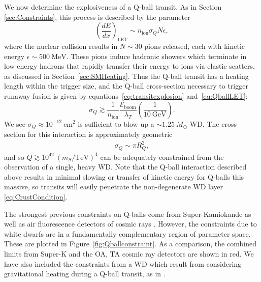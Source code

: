 \documentclass[twocolumn, preprintnumbers,amsmath,amssymb,prd, superscriptaddress]{revtex4}
\newcommand{\Eboom}{\mathcal{E}_\text{boom}}
\newcommand{\GeV}{\text{GeV}}
\def\r{\right)}
\def\l{\left(}
\begin{document}
We now determine the explosiveness of a Q-ball transit.
As in Section \ref{sec:Constraints}, this process is described by the parameter
\begin{equation}
\label{eq:QballLET}
\l\frac{dE}{dx}\r_\text{LET} \sim n_\text{ion} \sigma_Q N \epsilon,
\end{equation}
where the nuclear collision results in $N \sim 30$ pions released, each with kinetic energy $\epsilon \sim 500 ~\text{MeV}$.
These pions induce hadronic showers which terminate in low-energy hadrons that rapidly transfer their energy to ions via elastic scatters, as discussed in Section~\ref{sec:SMHeating}.
Thus the Q-ball transit has a heating length within the trigger size, and the Q-ball cross-section necessary to trigger runaway fusion is given by equations~\eqref{eq:transitexplosion} and~\eqref{eq:QballLET}:
\begin{equation}
 \sigma_Q \gtrsim \frac{1}{n_\text{ion}} \frac{\Eboom}{\lambda_T}
 \l \frac{1}{10~\GeV} \r.
\end{equation}
We see $\sigma_Q \approx 10^{-12} ~\text{cm}^2$ is sufficient to blow up a $\sim 1.25 ~M_{\odot}$ WD.
The cross-section for this interaction is approximately geometric
\begin{align}
\sigma_Q \sim \pi R_Q^2,
\end{align}
and so $Q \gtrsim 10^{42} ~(m_S/\text{TeV})^4$ can be adequately constrained from the observation of a single, heavy WD.
Note that the Q-ball interaction described above results in minimal slowing or transfer of kinetic energy for Q-balls this massive, so transits will easily penetrate the non-degenerate WD layer \eqref{eq:CrustCondition}.

The strongest previous constraints on Q-balls come from Super-Kamiokande as well as air fluorescence detectors of cosmic rays \cite{Dine:2003ax}.
However, the constraints due to white dwarfs are in a fundamentally complementary region of parameter space.
These are plotted in Figure~\ref{fig:Qballconstraint}.
As a comparison, the combined limits from Super-K and the OA, TA cosmic ray detectors are shown in red.
We have also included the constraints from a WD which result from considering gravitational heating during a Q-ball transit, as in \cite{Graham:2015apa}.
\end{document}
